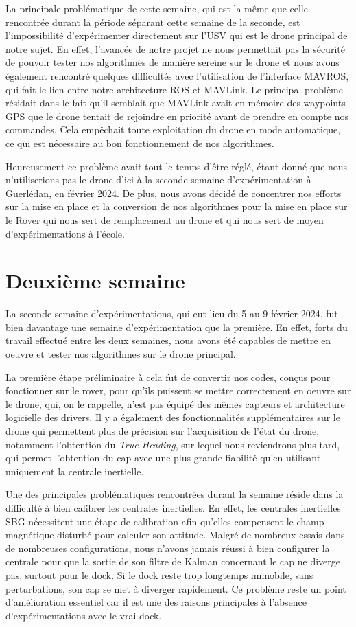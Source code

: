 \documentclass[12pt]{report}
\begin{document}
La principale problématique de cette semaine, qui est la même que celle rencontrée durant la période séparant cette semaine de la seconde, est l'impossibilité d'expérimenter directement sur l'USV qui 
est le drone principal de notre sujet. En effet, l'avancée de notre projet ne nous permettait pas la sécurité de pouvoir tester nos algorithmes de manière sereine sur le drone et nous avons également 
rencontré quelques difficultés avec l'utilisation de l'interface MAVROS, qui fait le lien entre notre architecture ROS et MAVLink. Le principal problème résidait dans le fait qu'il semblait que MAVLink 
avait en mémoire des waypoints GPS que le drone tentait de rejoindre en priorité avant de prendre en compte nos commandes. Cela empêchait toute exploitation du drone en mode automatique, ce qui est nécessaire
au bon fonctionnement de nos algorithmes.

Heureusement ce problème avait tout le temps d'être réglé, étant donné que nous n'utiliserions pas le drone d'ici à la seconde semaine d'expérimentation à Guerlédan, en février 2024. De plus, nous avons 
décidé de concentrer nos efforts sur la mise en place et la conversion de nos algorithmes pour la mise en place sur le Rover qui nous sert de remplacement au drone et qui nous sert de moyen d'expérimentations à l'école. 


\section{Deuxième semaine}

La seconde semaine d'expérimentations, qui eut lieu du 5 au 9 février 2024, fut bien davantage une semaine d'expérimentation que la première. 
En effet, forts du travail effectué entre les deux semaines, nous avons été capables de mettre en oeuvre et tester nos algorithmes sur le drone principal.

La première étape préliminaire à cela fut de convertir nos codes, conçus pour fonctionner sur le rover, pour qu'ils puissent se mettre correctement en oeuvre sur le drone, qui, on le rappelle, n'est pas
équipé des mêmes capteurs et architecture logicielle des drivers. Il y a également des fonctionnalités supplémentaires sur le drone qui permettent plus de précision sur l'acquisition de l'état du drone, notamment 
l'obtention du \textit{True Heading}, sur lequel nous reviendrons plus tard, qui permet l'obtention du cap avec une plus grande fiabilité qu'en utilisant uniquement la centrale inertielle. 

Une des principales problématiques rencontrées durant la semaine réside dans la difficulté à bien calibrer les centrales inertielles. En effet, les centrales inertielles SBG nécessitent une étape de calibration
afin qu'elles compensent le champ magnétique disturbé pour calculer son attitude. Malgré de nombreux essais dans de nombreuses configurations, nous n'avons jamais réussi à bien configurer la centrale 
pour que la sortie de son filtre de Kalman concernant le cap ne diverge pas, surtout pour le dock. Si le dock reste trop longtemps immobile, sans perturbations, son cap se met à diverger rapidement.
Ce problème reste un point d'amélioration essentiel car il est une des raisons principales à l'absence d'expérimentations avec le vrai dock. 
\end{document}
